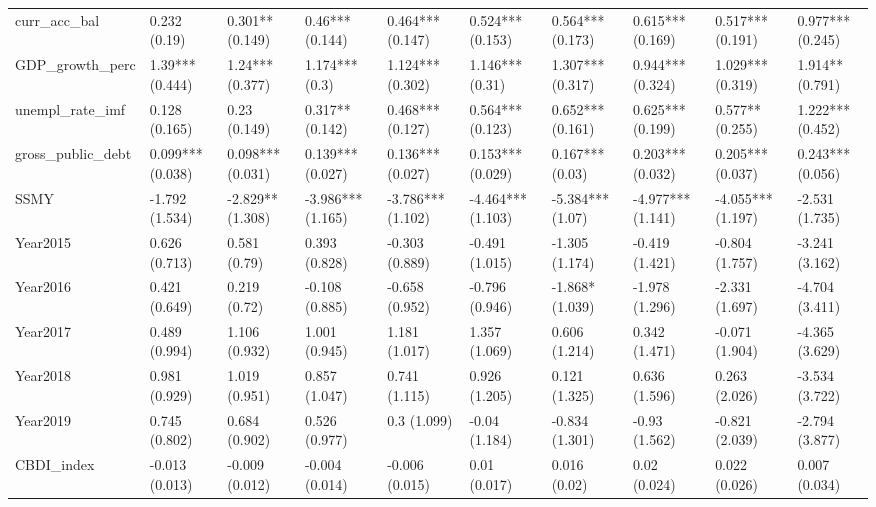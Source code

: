 \begin{table}[ht]
\begin{tabular}{llllllllll}
  curr\_acc\_bal & 0.232 (0.19) & 0.301** (0.149) & 0.46*** (0.144) & 0.464*** (0.147) & 0.524*** (0.153) & 0.564*** (0.173) & 0.615*** (0.169) & 0.517*** (0.191) & 0.977*** (0.245) \\ 
  GDP\_growth\_perc & 1.39*** (0.444) & 1.24*** (0.377) & 1.174*** (0.3) & 1.124*** (0.302) & 1.146*** (0.31) & 1.307*** (0.317) & 0.944*** (0.324) & 1.029*** (0.319) & 1.914** (0.791) \\ 
  unempl\_rate\_imf & 0.128 (0.165) & 0.23 (0.149) & 0.317** (0.142) & 0.468*** (0.127) & 0.564*** (0.123) & 0.652*** (0.161) & 0.625*** (0.199) & 0.577** (0.255) & 1.222*** (0.452) \\ 
  gross\_public\_debt & 0.099*** (0.038) & 0.098*** (0.031) & 0.139*** (0.027) & 0.136*** (0.027) & 0.153*** (0.029) & 0.167*** (0.03) & 0.203*** (0.032) & 0.205*** (0.037) & 0.243*** (0.056) \\ 
  SSMY & -1.792 (1.534) & -2.829** (1.308) & -3.986*** (1.165) & -3.786*** (1.102) & -4.464*** (1.103) & -5.384*** (1.07) & -4.977*** (1.141) & -4.055*** (1.197) & -2.531 (1.735) \\ 
  Year2015 & 0.626 (0.713) & 0.581 (0.79) & 0.393 (0.828) & -0.303 (0.889) & -0.491 (1.015) & -1.305 (1.174) & -0.419 (1.421) & -0.804 (1.757) & -3.241 (3.162) \\ 
  Year2016 & 0.421 (0.649) & 0.219 (0.72) & -0.108 (0.885) & -0.658 (0.952) & -0.796 (0.946) & -1.868* (1.039) & -1.978 (1.296) & -2.331 (1.697) & -4.704 (3.411) \\ 
  Year2017 & 0.489 (0.994) & 1.106 (0.932) & 1.001 (0.945) & 1.181 (1.017) & 1.357 (1.069) & 0.606 (1.214) & 0.342 (1.471) & -0.071 (1.904) & -4.365 (3.629) \\ 
  Year2018 & 0.981 (0.929) & 1.019 (0.951) & 0.857 (1.047) & 0.741 (1.115) & 0.926 (1.205) & 0.121 (1.325) & 0.636 (1.596) & 0.263 (2.026) & -3.534 (3.722) \\ 
  Year2019 & 0.745 (0.802) & 0.684 (0.902) & 0.526 (0.977) & 0.3 (1.099) & -0.04 (1.184) & -0.834 (1.301) & -0.93 (1.562) & -0.821 (2.039) & -2.794 (3.877) \\ 
  CBDI\_index & -0.013 (0.013) & -0.009 (0.012) & -0.004 (0.014) & -0.006 (0.015) & 0.01 (0.017) & 0.016 (0.02) & 0.02 (0.024) & 0.022 (0.026) & 0.007 (0.034) \\ 
   \bottomrule
\end{tabular}
\endgroup
\end{table}
